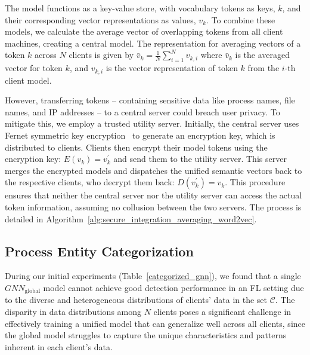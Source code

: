 
The \wordvec model functions as a key-value store, with vocabulary tokens as keys, \(k\), and their corresponding vector representations as values, \(v_k\). To combine these models, we calculate the average vector of overlapping tokens from all client machines, creating a central model. The representation for averaging vectors of a token \(k\) across \(N\) clients is given by \(\bar{v}_k = \frac{1}{N}\sum_{i=1}^{N} v_{k,i}\) where \(\bar{v}_k\) is the averaged vector for token \(k\), and \(v_{k,i}\) is the vector representation of token \(k\) from the \(i\)-th client model.


 However, transferring tokens -- containing sensitive data like process names, file names, and IP addresses -- to a central server could breach user privacy. To mitigate this, we employ a trusted utility server. Initially, the central server uses Fernet symmetric key encryption~\cite{ismail2020fernet,bokhari2016review} to generate an encryption key, which is distributed to clients. Clients then encrypt their \wordvec model tokens using the encryption key: \( E(v_{k}) = v_{k}^{'} \) and send them to the utility server. This server merges the encrypted models and dispatches the unified semantic vectors back to the respective clients, who decrypt them back: \( D(v_{k}^{'}) = v_{k} \). This procedure ensures that neither the central server nor the utility server can access the actual token information, assuming no collusion between the two servers. The process is detailed in Algorithm~\ref{alg:secure_integration_averaging_word2vec}.



\subsection{Process Entity Categorization}
\label{sys:catg}

During our initial experiments (Table~\ref{categorized_gnn}), we found that a single \( {GNN}_{\text{global}} \) model cannot achieve good detection performance in an FL setting due to the diverse and heterogeneous distributions of clients' data in the set \( \mathcal{C} \). The disparity in data distributions among \( N \) clients poses a significant challenge in effectively training a unified model that can generalize well across all clients, since the global model struggles to capture the unique characteristics and patterns inherent in each client's data.

